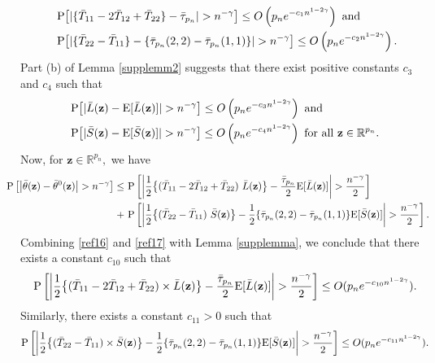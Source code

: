 \documentclass[twoside]{article}
\newcommand{\bz}{\mathbf{z}}
\newcommand{\0}{\mathbf{0}}
\newcommand{\1}{\mathbf{1}}
\numberwithin{equation}{section}
\begin{document}
\begin{enumerate}[(a)]
\begin{align}\label{ref16}
 &\ {\rm P}\big [|\{\bar{T}_{11}-2\bar{T}_{12}+\bar{T}_{22}\}- \bar{\tau}_{p_n}|>n^{-\gamma}\big ]\leq O\left (p_ne^{-c_1 n^{1-2\gamma}}\right )\text{ and }\nonumber \\
 &\
 {\rm P}\big [|\{\bar{T}_{22}-\bar{T}_{11}\}- \{\bar{\tau}_{p_n}(2,2)-\bar{\tau}_{p_n}(1,1)\}|>n^{-\gamma}\big ]\leq O\left (p_ne^{-c_2 n^{1-2\gamma}}\right ).
\end{align}
Part (b) of Lemma \ref{supplemm2} suggests that there exist positive constants $c_3$ and $c_4$ such that
\begin{align}\label{ref17}
 &{\rm P}\big [|\bar{L}(\bz)-{\rm E}[\bar{L}(\bz)]|>n^{-\gamma}\big ]\leq O\left (p_ne^{-c_3 n^{1-2\gamma}}\right )\text{ and }\nonumber \\
 &{\rm P}\big [|\bar{S}(\bz)-{\rm E}[\bar{S}(\bz)]|>n^{-\gamma}\big ]\leq O\left (p_ne^{-c_4 n^{1-2\gamma}}\right )\text{ for all }\bz\in\mathbb{R}^{p_n}.
\end{align}
Now, for $\bz\in\mathbb{R}^{p_n},$ we have
\begin{align}\label{ref18}
\hspace{-0.5cm}{\rm P}\left [\left |\bar{\theta}(\bz)-\bar{\theta}^0(\bz)\right |>n^{-\gamma}\right ]
\leq &\ {\rm P}\left [\left |\frac{1}{2}\big \{(\bar{T}_{11}-2\bar{T}_{12}+\bar{T}_{22}) \ \bar{L}(\bz)\big \}-\frac{\bar{\tau}_{p_n}}{2}{\rm E}[\bar{L}(\bz)]\right |>\frac{n^{-\gamma}}{2}\right ]\nonumber \\
+&\ {\rm P}\left [\left |\frac{1}{2}\big \{(\bar{T}_{22}-\bar{T}_{11})\ \bar{S}(\bz)\big \}-\frac{1}{2}\{\bar{\tau}_{p_n}(2,2)-\bar{\tau}_{p_n}(1,1)\}{\rm E}[\bar{S}(\bz)]\right |>\frac{n^{-\gamma}}{2}\right ].
\end{align}
Combining \eqref{ref16} and \eqref{ref17} with Lemma \ref{supplemma}, we conclude that there exists a constant $c_{10}$ such that
\begin{align}\label{E1}
 {\rm P}\left [\left |\frac{1}{2}\big \{(\bar{T}_{11}-2\bar{T}_{12}+\bar{T}_{22})\times \bar{L}(\bz)\big \}-\frac{\bar{\tau}_{p_n}}{2}{\rm E}[\bar{L}(\bz)]\right |>\frac{n^{-\gamma}}{2}\right ]\leq O(p_n e^{-c_{10} n^{1-2\gamma}}).
\end{align}
Similarly, there exists a constant $c_{11}>0$ such that
\begin{align}\label{E2}
 {\rm P}\left [\left |\frac{1}{2}\big \{(\bar{T}_{22}-\bar{T}_{11})\times \bar{S}(\bz)\big \}-\frac{1}{2}\{\bar{\tau}_{p_n}(2,2)-\bar{\tau}_{p_n}(1,1)\}{\rm E}[\bar{S}(\bz)]\right |>\frac{n^{-\gamma}}{2}\right ]\leq O(p_n e^{-c_{11} n^{1-2\gamma}}).

\end{align}
\end{enumerate}
\end{document}
